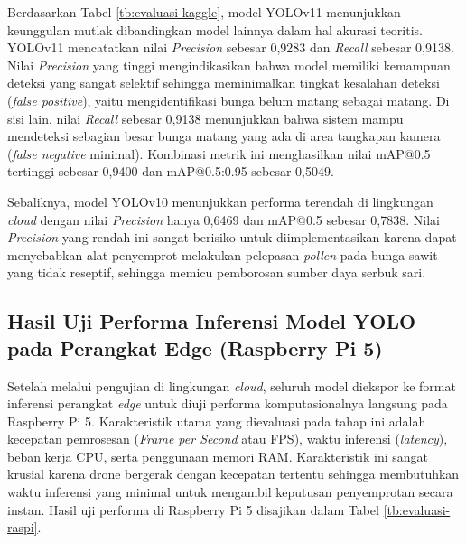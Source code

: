 Berdasarkan Tabel \ref{tb:evaluasi-kaggle}, model YOLOv11 menunjukkan keunggulan mutlak dibandingkan model lainnya dalam hal akurasi teoritis. YOLOv11 mencatatkan nilai \emph{Precision} sebesar 0,9283 dan \emph{Recall} sebesar 0,9138. Nilai \emph{Precision} yang tinggi mengindikasikan bahwa model memiliki kemampuan deteksi yang sangat selektif sehingga meminimalkan tingkat kesalahan deteksi (\emph{false positive}), yaitu mengidentifikasi bunga belum matang sebagai matang. Di sisi lain, nilai \emph{Recall} sebesar 0,9138 menunjukkan bahwa sistem mampu mendeteksi sebagian besar bunga matang yang ada di area tangkapan kamera (\emph{false negative} minimal). Kombinasi metrik ini menghasilkan nilai mAP@0.5 tertinggi sebesar 0,9400 dan mAP@0.5:0.95 sebesar 0,5049.

Sebaliknya, model YOLOv10 menunjukkan performa terendah di lingkungan \emph{cloud} dengan nilai \emph{Precision} hanya 0,6469 dan mAP@0.5 sebesar 0,7838. Nilai \emph{Precision} yang rendah ini sangat berisiko untuk diimplementasikan karena dapat menyebabkan alat penyemprot melakukan pelepasan \emph{pollen} pada bunga sawit yang tidak reseptif, sehingga memicu pemborosan sumber daya serbuk sari.

\subsection{Hasil Uji Performa Inferensi Model YOLO pada Perangkat Edge (Raspberry Pi 5)}
\label{sec:yolo-rpi}
Setelah melalui pengujian di lingkungan \emph{cloud}, seluruh model diekspor ke format inferensi perangkat \emph{edge} untuk diuji performa komputasionalnya langsung pada Raspberry Pi 5. Karakteristik utama yang dievaluasi pada tahap ini adalah kecepatan pemrosesan (\emph{Frame per Second} atau FPS), waktu inferensi (\emph{latency}), beban kerja CPU, serta penggunaan memori RAM. Karakteristik ini sangat krusial karena drone bergerak dengan kecepatan tertentu sehingga membutuhkan waktu inferensi yang minimal untuk mengambil keputusan penyemprotan secara instan. Hasil uji performa di Raspberry Pi 5 disajikan dalam Tabel \ref{tb:evaluasi-raspi}.

